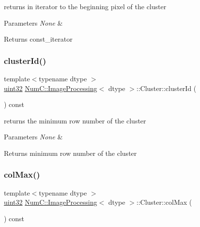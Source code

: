 returns in iterator to the beginning pixel of the cluster


\begin{DoxyParams}{Parameters}
{\em None} & \\
\hline
\end{DoxyParams}
\begin{DoxyReturn}{Returns}
const\+\_\+iterator 
\end{DoxyReturn}
\mbox{\label{class_num_c_1_1_image_processing_1_1_cluster_a8fe2d714671211323492cb875b7de7c9}} 
\subsubsection{\texorpdfstring{cluster\+Id()}{clusterId()}}
{\footnotesize\ttfamily template$<$typename dtype $>$ \\
\mbox{\hyperlink{namespace_num_c_ae685802ca6d3035f2b400b081e3953fa}{uint32}} \mbox{\hyperlink{class_num_c_1_1_image_processing}{Num\+C\+::\+Image\+Processing}}$<$ dtype $>$\+::Cluster\+::cluster\+Id (\begin{DoxyParamCaption}{ }\end{DoxyParamCaption}) const\hspace{0.3cm}{\ttfamily [inline]}}

returns the minimum row number of the cluster


\begin{DoxyParams}{Parameters}
{\em None} & \\
\hline
\end{DoxyParams}
\begin{DoxyReturn}{Returns}
minimum row number of the cluster 
\end{DoxyReturn}
\mbox{\label{class_num_c_1_1_image_processing_1_1_cluster_a8e01fbf35d0e95108c7e44bf271650a0}} 
\subsubsection{\texorpdfstring{col\+Max()}{colMax()}}
{\footnotesize\ttfamily template$<$typename dtype $>$ \\
\mbox{\hyperlink{namespace_num_c_ae685802ca6d3035f2b400b081e3953fa}{uint32}} \mbox{\hyperlink{class_num_c_1_1_image_processing}{Num\+C\+::\+Image\+Processing}}$<$ dtype $>$\+::Cluster\+::col\+Max (\begin{DoxyParamCaption}{ }\end{DoxyParamCaption}) const\hspace{0.3cm}{\ttfamily [inline]}}

